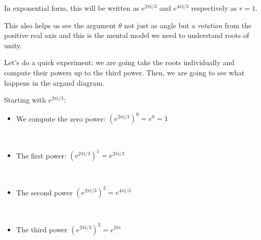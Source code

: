\documentclass[11pt]{article}
\providecommand{\tightlist}{%
      \setlength{\itemsep}{0pt}\setlength{\parskip}{0pt}}
\begin{document}
In exponential form, this will be written as \(e^{2\pi\mathrm{i}/3}\)
and \(e^{4\pi\mathrm{i}/3}\) respectively as \(r = 1\).

This also helps us see the argument \(\theta\) not just as angle but a
\emph{rotation} from the positive real axis and this is the mental model
we need to understand roots of unity.

Let's do a quick experiment: we are going take the roots individually
and compute their powers up to the third power. Then, we are going to
see what happens in the argand diagram.

Starting with \(e^{2\pi\mathrm{i}/3}\):

\begin{itemize}
\tightlist
\item
  We compute the zero power: \((e^{2\pi\mathrm{i}/3})^0 = e^{0} = 1\)
\end{itemize}

    \begin{center}
    \end{center}
    { \hspace*{\fill} \\}
    
    \begin{itemize}
\tightlist
\item
  The first power: \((e^{2\pi\mathrm{i}/3})^1 = e^{2\pi\mathrm{i}/3}\)
\end{itemize}

    \begin{center}
    \end{center}
    { \hspace*{\fill} \\}
    
    \begin{itemize}
\tightlist
\item
  The second power \((e^{2\pi\mathrm{i}/3})^2 = e^{4\pi\mathrm{i}/3}\)
\end{itemize}

    \begin{center}
    \end{center}
    { \hspace*{\fill} \\}
    
    \begin{itemize}
\tightlist
\item
  The third power \((e^{2\pi\mathrm{i}/3})^3 = e^{2\pi\mathrm{i}}\)
\end{itemize}
\end{document}
